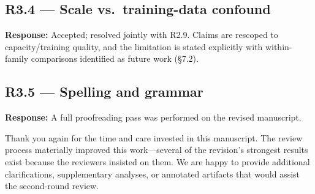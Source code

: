 \documentclass[11pt]{article}
\newcommand{\resp}{\noindent\textbf{Response:} }
\begin{document}
\subsection*{R3.4 --- Scale vs.\ training-data confound}
\resp Accepted; resolved jointly with R2.9. Claims are rescoped to capacity/training quality, and the limitation is stated explicitly with within-family comparisons identified as future work (\S7.2).

\subsection*{R3.5 --- Spelling and grammar}
\resp A full proofreading pass was performed on the revised manuscript.

\bigskip
\noindent Thank you again for the time and care invested in this manuscript. The review process materially improved this work---several of the revision's strongest results exist because the reviewers insisted on them. We are happy to provide additional clarifications, supplementary analyses, or annotated artifacts that would assist the second-round review.
\end{document}
